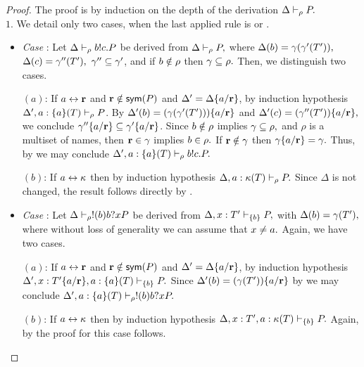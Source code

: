 \begin{proof}
The proof is by induction on the depth of the derivation $ \Delta\vdash_\rho P.$
\\
$\mathit{1.}$ We detail only two cases, when the last applied rule is  or . 
\begin{itemize}
\item \emph{Case} : Let $ \Delta\vdash_\rho b!c.P$ be derived from $ \Delta\vdash_{\rho} P,$ where $\Delta(b)=\gamma(\gamma'(T')),$ $\Delta(c)=\gamma''(T'),$ 	 $\gamma''\subseteq \gamma'$, and if $b\notin\rho$ then $\gamma \subseteq\rho.$ 
Then, we distinguish two cases.

$(a)$: If $a \leftrightarrow {\mathbf{r}}$ and ${\mathbf{r}}\notin \mathsf{sym}(P)$ and $\Delta'=\Delta\{a/{\mathbf{r}}\}$, by induction hypothesis $ \Delta', a: \{a\}(T) \vdash_\rho P$. By $\Delta'(b)=(\gamma(\gamma'(T')))\{a/{\mathbf{r}}\}$ and $\Delta'(c)=(\gamma''(T'))\{a/{\mathbf{r}}\},$ we conclude $\gamma''\{a/{\mathbf{r}}\}\subseteq \gamma'\{a/{\mathbf{r}}\}$. Since $b\notin\rho$ implies $\gamma \subseteq\rho,$ and $\rho$ is a multiset of names, then ${\mathbf{r}}\in\gamma$  implies $b \in\rho.$ If ${\mathbf{r}} \notin \gamma$ then $\gamma\{a/{\mathbf{r}}\}=\gamma.$ Thus, by  we may conclude $ \Delta', a: \{a\}(T) \vdash_\rho b!c.P.$

$(b)$: If $a \leftrightarrow {\mathbf{\kappa}}$ then by induction hypothesis $ \Delta, a: {\mathbf{\kappa}}(T) \vdash_\rho P.$ Since $\Delta$ is not changed, the result follows directly by .

\item \emph{Case} : Let $ \Delta\vdash_{\rho} !(b)b?xP$ be derived from $ \Delta, x: T' \vdash_{\{b\}}P,$ with  $\Delta(b)=\gamma(T'),$ where without loss of generality we can assume that $x\not=a.$ Again, we have two cases.

$(a)$: If $a \leftrightarrow {\mathbf{r}}$ and ${\mathbf{r}}\notin \mathsf{sym}(P)$ and $\Delta'=\Delta\{a/{\mathbf{r}}\}$, by induction hypothesis $\Delta', x:T'\{a/{\mathbf{r}}\}, a: \{a\}(T) \vdash_{\{b\}} P.$ Since $\Delta'(b)=(\gamma(T'))\{a/{\mathbf{r}}\}$ by  we may conclude $ \Delta', a: \{a\}(T) \vdash_{\rho} !(b)b?xP.$

$(b)$: If $a \leftrightarrow {\mathbf{\kappa}}$ then by induction hypothesis $ \Delta, x: T', a: {\mathbf{\kappa}}(T) \vdash_{\{b\}} P.$ Again, by  the proof for this case follows.



\end{itemize}
\end{proof}
